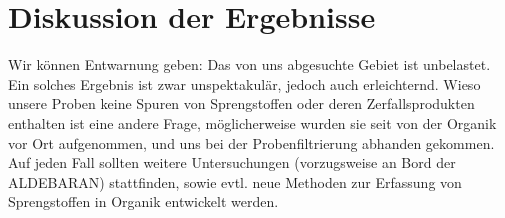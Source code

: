  
\chapter[Diskussion der Ergebnisse]{Diskussion der Ergebnisse}
Wir können Entwarnung geben: Das von uns abgesuchte Gebiet ist unbelastet. Ein
solches Ergebnis ist zwar unspektakulär, jedoch auch erleichternd. Wieso 
unsere Proben keine Spuren von Sprengstoffen oder deren Zerfallsprodukten 
enthalten ist eine andere Frage, möglicherweise wurden sie seit %
von der Organik vor Ort aufgenommen, und uns bei der Probenfiltrierung
abhanden gekommen. Auf jeden Fall sollten weitere Untersuchungen (vorzugsweise
an Bord der ALDEBARAN) stattfinden, sowie evtl. neue Methoden zur Erfassung
von Sprengstoffen in Organik entwickelt werden.

